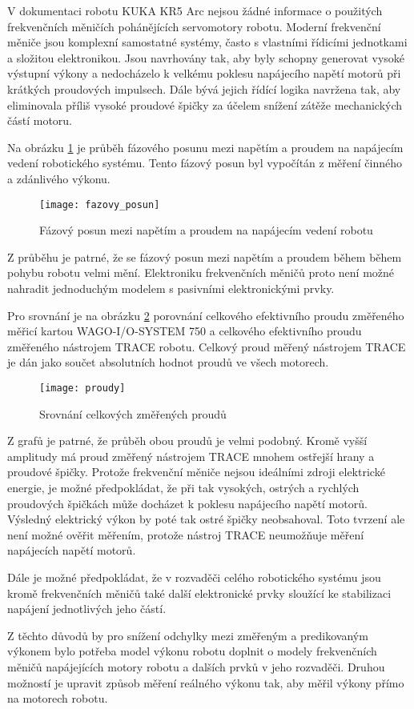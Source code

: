 V dokumentaci robotu KUKA KR5 Arc nejsou žádné informace o použitých frekvenčních měničích pohánějících servomotory robotu. Moderní frekvenční měniče jsou komplexní samostatné systémy, často s vlastními řídicími jednotkami a složitou elektronikou. Jsou navrhovány tak, aby byly schopny generovat vysoké výstupní výkony a nedocházelo k velkému poklesu napájecího napětí motorů při krátkých proudových impulsech. Dále bývá jejich řídící logika navržena tak, aby eliminovala příliš vysoké proudové špičky za účelem snížení zátěže mechanických částí motoru.

Na obrázku \ref{fazovy_posun_pic} je průběh fázového posunu mezi napětím a proudem na napájecím vedení robotického systému. Tento fázový posun byl vypočítán z měření činného a zdánlivého výkonu. 

\begin{figure}[h!]
\texttt{[image: fazovy\_posun]}
\caption{Fázový posun mezi napětím a proudem na napájecím vedení robotu}
\label{fazovy_posun_pic}
\end{figure}

Z průběhu je patrné, že se fázový posun mezi napětím a proudem během během pohybu robotu velmi mění. Elektroniku frekvenčních měničů proto není možné nahradit jednoduchým modelem s pasivními elektronickými prvky.  

Pro srovnání je na obrázku \ref{proudy_pic} porovnání celkového efektivního proudu změřeného měřicí kartou WAGO-I/O-SYSTEM 750 a celkového efektivního proudu změřeného nástrojem TRACE robotu. Celkový proud měřený nástrojem TRACE je dán jako součet absolutních hodnot proudů ve všech motorech.

\begin{figure}[h!]
\texttt{[image: proudy]}
\caption{Srovnání celkových změřených proudů}
\label{proudy_pic}
\end{figure}

Z grafů je patrné, že průběh obou proudů je velmi podobný. Kromě vyšší amplitudy má proud změřený nástrojem TRACE mnohem ostřejší hrany a proudové špičky. Protože frekvenční měniče nejsou ideálními zdroji elektrické energie, je možné předpokládat, že při tak vysokých, ostrých a rychlých proudových špičkách může docházet k poklesu napájecího napětí motorů. Výsledný elektrický výkon by poté tak ostré špičky neobsahoval. Toto tvrzení ale není možné ověřit měřením, protože nástroj TRACE neumožňuje měření napájecích napětí motorů.

\newpage

Dále je možné předpokládat, že v rozvaděči celého robotického systému jsou kromě frekvenčních měničů také další elektronické prvky sloužící ke stabilizaci napájení jednotlivých jeho částí. 

Z těchto důvodů by pro snížení odchylky mezi změřeným a predikovaným výkonem bylo potřeba model výkonu robotu doplnit o modely frekvenčních měničů napájejících motory robotu a dalších prvků v jeho rozvaděči. Druhou možností je upravit způsob měření reálného výkonu tak, aby měřil výkony přímo na motorech robotu.
